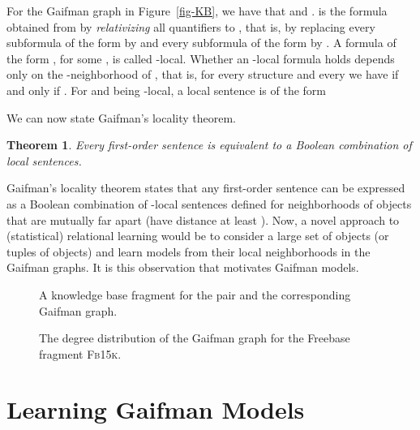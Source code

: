 \documentclass{article}
\newtheorem{theorem}{Theorem}
\begin{document}
For the Gaifman graph in Figure~\ref{fig-KB}, we have that  and .
 is the formula obtained from  by \emph{relativizing} all quantifiers to , that is, by replacing every subformula of the form 
 by  and every subformula of the form  by .
A formula  of the form , for some , is called -local. Whether an -local formula  holds depends only on the -neighborhood of , that is, for every structure  and every  we have  if and only if .
For  and  being -local, a local sentence is of the form


We can now state Gaifman's locality theorem.
\begin{theorem}\cite{gaifman:1982}
Every first-order sentence is equivalent to a Boolean combination of local sentences.
\end{theorem}



Gaifman's locality theorem states that any first-order sentence can be expressed as a Boolean combination of -local sentences defined for neighborhoods of objects that are mutually far apart (have distance at least ). Now, a novel approach to (statistical) relational learning would be to consider a large set of objects (or tuples of objects) and learn models from their local neighborhoods in the Gaifman graphs. It is this observation that motivates Gaifman models.







\begin{figure}[t!]
\begin{minipage}[b]{.48\textwidth}
\centering
{}\caption{A knowledge base fragment for the pair  and the corresponding Gaifman graph.}\label{fig-KB}
\end{minipage}
\hspace{3mm}
\begin{minipage}[b]{.49\textwidth}
\centering
{}
\caption{The degree distribution of the Gaifman graph for the Freebase fragment \textsc{Fb15k}.}
\label{fig-node-distr}
\end{minipage}
\end{figure}






\section{Learning Gaifman Models}
\end{document}

